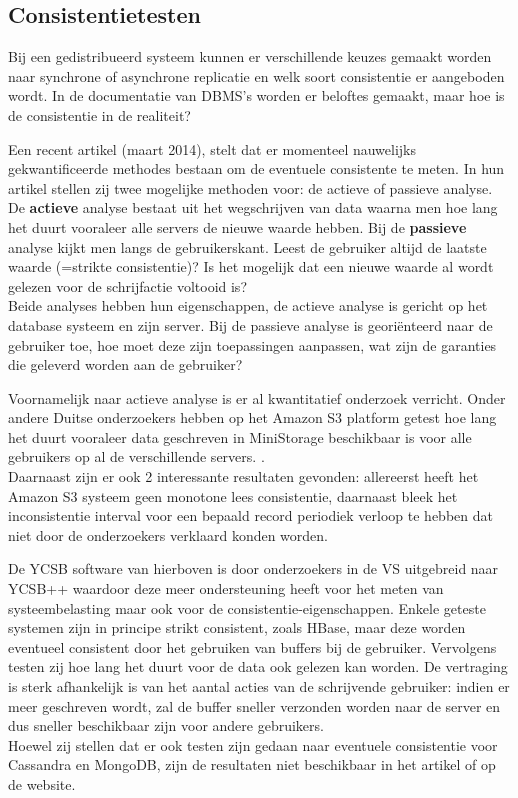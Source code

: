 \subsection{Consistentietesten}
Bij een gedistribueerd systeem kunnen er verschillende keuzes gemaakt worden naar synchrone of asynchrone replicatie en welk soort consistentie er aangeboden wordt. In de documentatie van DBMS's worden er beloftes gemaakt, maar hoe is de consistentie in de realiteit?

Een recent artikel \cite{golab2014eventually} (maart 2014), stelt dat er momenteel nauwelijks gekwantificeerde methodes bestaan om de eventuele consistente te meten. In hun artikel stellen zij twee mogelijke methoden voor: de actieve of passieve analyse. \\
De \textbf{actieve} analyse bestaat uit het wegschrijven van data waarna men hoe lang het duurt vooraleer alle servers de nieuwe waarde hebben. 
Bij de \textbf{passieve} analyse kijkt men langs de gebruikerskant. Leest de gebruiker altijd de laatste waarde (=strikte consistentie)? Is het mogelijk dat een nieuwe waarde al wordt gelezen voor de schrijfactie voltooid is? \\
Beide analyses hebben hun eigenschappen, de actieve analyse is gericht op het database systeem en zijn server. 
Bij de passieve analyse is georiënteerd naar de gebruiker toe, hoe moet deze zijn toepassingen aanpassen, wat zijn de garanties die geleverd worden aan de gebruiker? 

Voornamelijk naar actieve analyse is er al kwantitatief onderzoek verricht. Onder andere Duitse onderzoekers hebben op het Amazon S3 platform getest hoe lang het duurt vooraleer data geschreven in MiniStorage beschikbaar is voor alle gebruikers op al de verschillende servers. \cite{bermbach2011eventual}. \\
Daarnaast zijn er ook 2 interessante resultaten gevonden: allereerst heeft het Amazon S3 systeem geen monotone lees consistentie, daarnaast bleek het inconsistentie interval voor een bepaald record periodiek verloop te hebben dat niet door de onderzoekers verklaard konden worden. 

De YCSB software van hierboven is door onderzoekers in de VS uitgebreid naar YCSB++\cite{patil2011ycsb++} waardoor deze meer ondersteuning heeft voor het meten van systeembelasting maar ook voor de consistentie-eigenschappen. Enkele geteste systemen zijn in principe strikt consistent, zoals HBase, maar deze worden eventueel consistent door het gebruiken van buffers bij de gebruiker. Vervolgens testen zij hoe lang het duurt voor de data ook gelezen kan worden. De vertraging is sterk afhankelijk is van het aantal acties van de schrijvende gebruiker: indien er meer geschreven wordt, zal de buffer sneller verzonden worden naar de server en dus sneller beschikbaar zijn voor andere gebruikers. \\
Hoewel zij stellen dat er ook testen zijn gedaan naar eventuele consistentie voor Cassandra en MongoDB, zijn de resultaten niet beschikbaar in het artikel of op de website. 

